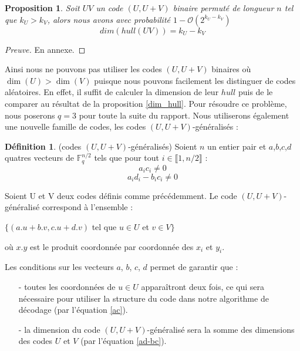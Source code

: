\documentclass[12pt]{article}
\theoremstyle{plain}
\newtheorem{propo}[thm]{Proposition}
\theoremstyle{definition}
\newtheorem{defi}[thm]{Définition}
\newcommand{\F}{\mathbb{F}}
\begin{document}
\begin{propo}\label{dim_hull_UV}
Soit $UV$ un code $(U,U+V)$ binaire permuté de longueur $n$ tel que $k_U > k_V$, alors nous avons avec probabilité $1-\mathcal{O}(2^{k_U-k_V})$
$$ dim(hull(UV)) = k_U - k_V $$
\end{propo}

\begin{proof}[Preuve]
En annexe.
\end{proof}

\noindent Ainsi nous ne pouvons pas utiliser les codes $(U,U+V)$ binaires où $\dim(U) > \dim(V)$ puisque nous pouvons facilement les distinguer de codes aléatoires.
En effet, il suffit de calculer la dimension de  leur $hull$ puis de le comparer au résultat de la proposition \ref{dim_hull}.
Pour résoudre ce problème, nous poserons $q=3$ pour toute la suite du rapport.
Nous utiliserons également une nouvelle famille de codes, les codes $(U,U+V)$-généralisés :\\
\begin{defi} \label{UV-normalise} (codes $(U,U+V)$-généralisés) Soient $n$ un entier pair et $a$,$b$,$c$,$d$ quatres vecteurs de $\F_q^{n/2}$ tels que pour tout $i \in \llbracket 1,n/2\rrbracket$ :
\begin{equation}\label{ac}
a_ic_i \neq 0 
\end{equation}
\begin{equation}\label{ad-bc}
a_id_i - b_ic_i \neq 0 
\end{equation}

\noindent Soient U et V deux codes définis comme précédemment. Le code $(U,U+V)$-généralisé correspond à l'ensemble :
\begin{center}
$\{(a.u + b.v, c.u + d.v)$ tel que $u \in U$ et $v \in V \}$
\end{center}
où $x.y$ est le produit coordonnée par coordonnée des $x_i$ et $y_i$.\\
\end{defi}


\noindent Les conditions sur les vecteurs $a$, $b$, $c$, $d$ permet de garantir que :
\begin{itemize}
\item[-] toutes les coordonnées de $u \in U$ apparaîtront deux fois, ce qui sera nécessaire pour utiliser la structure du code dans notre algorithme de décodage (par l'équation \eqref{ac}).
\item[-] la dimension du code $(U,U+V)$-généralisé sera la somme des dimensions des codes $U$ et $V$ (par l'équation \eqref{ad-bc}).
\end{itemize}
\end{document}
